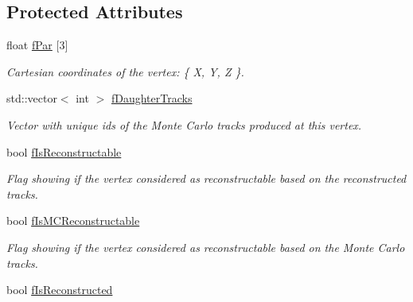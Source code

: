 \subsection*{Protected Attributes}
\begin{DoxyCompactItemize}
\item 
float \hyperlink{classKFMCVertex_a647ebd7994aa422d5455a3f66d9bbff9}{f\+Par} \mbox{[}3\mbox{]}\hypertarget{classKFMCVertex_a647ebd7994aa422d5455a3f66d9bbff9}{}\label{classKFMCVertex_a647ebd7994aa422d5455a3f66d9bbff9}

\begin{DoxyCompactList}\small\item\em Cartesian coordinates of the vertex\+: \{ X, Y, Z \}. \end{DoxyCompactList}\item 
std\+::vector$<$ int $>$ \hyperlink{classKFMCVertex_a531546b4d9daed2c31383e90ad47a42b}{f\+Daughter\+Tracks}\hypertarget{classKFMCVertex_a531546b4d9daed2c31383e90ad47a42b}{}\label{classKFMCVertex_a531546b4d9daed2c31383e90ad47a42b}

\begin{DoxyCompactList}\small\item\em Vector with unique ids of the Monte Carlo tracks produced at this vertex. \end{DoxyCompactList}\item 
bool \hyperlink{classKFMCVertex_a47a4c3b574ca9b0a74e4613ecf326bb6}{f\+Is\+Reconstructable}\hypertarget{classKFMCVertex_a47a4c3b574ca9b0a74e4613ecf326bb6}{}\label{classKFMCVertex_a47a4c3b574ca9b0a74e4613ecf326bb6}

\begin{DoxyCompactList}\small\item\em Flag showing if the vertex considered as reconstructable based on the reconstructed tracks. \end{DoxyCompactList}\item 
bool \hyperlink{classKFMCVertex_a70ebe127df16f9f55051759292dabf52}{f\+Is\+M\+C\+Reconstructable}\hypertarget{classKFMCVertex_a70ebe127df16f9f55051759292dabf52}{}\label{classKFMCVertex_a70ebe127df16f9f55051759292dabf52}

\begin{DoxyCompactList}\small\item\em Flag showing if the vertex considered as reconstructable based on the Monte Carlo tracks. \end{DoxyCompactList}\item 
bool \hyperlink{classKFMCVertex_a1a064ccde676f3baa5f100f911dabe27}{f\+Is\+Reconstructed}\hypertarget{classKFMCVertex_a1a064ccde676f3baa5f100f911dabe27}{}\label{classKFMCVertex_a1a064ccde676f3baa5f100f911dabe27}


\end{DoxyCompactItemize}
